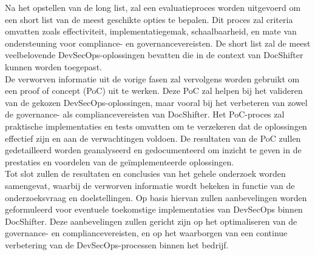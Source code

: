 \documentclass{hogent-article}
\begin{document}
    \noindent Na het opstellen van de long list, zal een evaluatieproces worden uitgevoerd om een short list van de meest geschikte opties te bepalen. Dit proces zal criteria omvatten zoals effectiviteit, implementatiegemak, schaalbaarheid, en mate van ondersteuning voor compliance- en governancevereisten. De short list zal de meest veelbelovende DevSecOps-oplossingen bevatten die in de context van DocShifter kunnen worden toegepast.\\
    
    \noindent De verworven informatie uit de vorige fasen zal vervolgens worden gebruikt om een proof of concept (PoC) uit te werken. Deze PoC zal helpen bij het valideren van de gekozen DevSecOps-oplossingen, maar vooral bij het verbeteren van zowel de governance- als compliancevereisten van DocShifter. Het PoC-proces zal praktische implementaties en tests omvatten om te verzekeren dat de oplossingen effectief zijn en aan de verwachtingen voldoen. De resultaten van de PoC zullen gedetailleerd worden geanalyseerd en gedocumenteerd om inzicht te geven in de prestaties en voordelen van de geïmplementeerde oplossingen.\\
    
    \noindent Tot slot zullen de resultaten en conclusies van het gehele onderzoek worden samengevat, waarbij de verworven informatie wordt bekeken in functie van de onderzoeksvraag en doelstellingen. Op basis hiervan zullen aanbevelingen worden geformuleerd voor eventuele toekomstige implementaties van DevSecOps binnen DocShifter. Deze aanbevelingen zullen gericht zijn op het optimaliseren van de governance- en compliancevereisten, en op het waarborgen van een continue verbetering van de DevSecOps-processen binnen het bedrijf.

    
\end{document}
